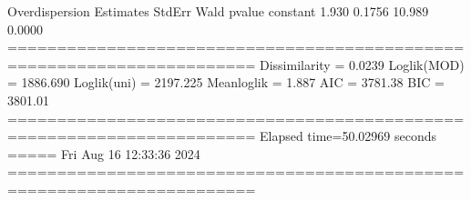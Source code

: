 \documentclass[letterpaper,10pt,english]{sphinxmanual}
\begin{document}
\begin{sphinxVerbatim}[commandchars=\\\{\}]
Overdispersion
          Estimates  StdErr     Wald  p\PYGZhy{}value
constant     \PYGZhy{}1.930  0.1756  \PYGZhy{}10.989   0.0000
=======================================================================
Dissimilarity = 0.0239
Loglik(MOD)   = \PYGZhy{}1886.690
Loglik(uni)   = \PYGZhy{}2197.225
Mean\PYGZhy{}loglik   = \PYGZhy{}1.887
\PYGZhy{}\PYGZhy{}\PYGZhy{}\PYGZhy{}\PYGZhy{}\PYGZhy{}\PYGZhy{}\PYGZhy{}\PYGZhy{}\PYGZhy{}\PYGZhy{}\PYGZhy{}\PYGZhy{}\PYGZhy{}\PYGZhy{}\PYGZhy{}\PYGZhy{}\PYGZhy{}\PYGZhy{}\PYGZhy{}\PYGZhy{}\PYGZhy{}\PYGZhy{}\PYGZhy{}\PYGZhy{}\PYGZhy{}\PYGZhy{}\PYGZhy{}\PYGZhy{}\PYGZhy{}\PYGZhy{}\PYGZhy{}\PYGZhy{}\PYGZhy{}\PYGZhy{}\PYGZhy{}\PYGZhy{}\PYGZhy{}\PYGZhy{}\PYGZhy{}\PYGZhy{}\PYGZhy{}\PYGZhy{}\PYGZhy{}\PYGZhy{}\PYGZhy{}\PYGZhy{}\PYGZhy{}\PYGZhy{}\PYGZhy{}\PYGZhy{}\PYGZhy{}\PYGZhy{}\PYGZhy{}\PYGZhy{}\PYGZhy{}\PYGZhy{}\PYGZhy{}\PYGZhy{}\PYGZhy{}\PYGZhy{}\PYGZhy{}\PYGZhy{}\PYGZhy{}\PYGZhy{}\PYGZhy{}\PYGZhy{}\PYGZhy{}\PYGZhy{}\PYGZhy{}\PYGZhy{}
AIC = 3781.38
BIC = 3801.01
=======================================================================
Elapsed time=50.02969 seconds =====\PYGZgt{}\PYGZgt{}\PYGZgt{} Fri Aug 16 12:33:36 2024
=======================================================================
\end{sphinxVerbatim}

\noindent{}
\end{document}
